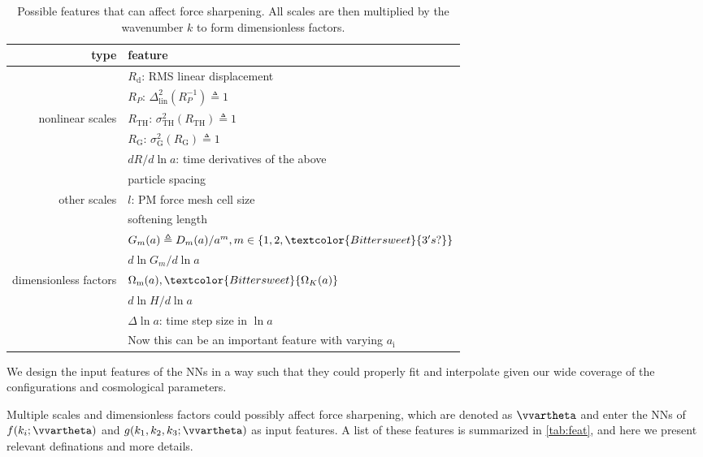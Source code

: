 \documentclass[modern, trackchanges, dvipsnames]{aastex631}
\renewcommand{\d}{d}
\newcommand{\lna}{\ln\!a}
\newcommand{\Omegam}{\Omega_\mathrm{m}}
\newcommand{\OmegaK}{\Omega_K}
\newcommand{\ic}{\mathrm{i}}
\newcommand{\linear}{\mathrm{lin}}
\newcommand{\tophat}{\mathrm{TH}}
\newcommand{\gauss}{\mathrm{G}}
\newcommand{\YL}[1]{\textcolor{Bittersweet}{#1}}
\begin{document}
\begin{table}
  \centering
  \caption{Possible features that can affect force sharpening.
  All scales are then multiplied by the wavenumber $k$ to form dimensionless
  factors.}
  \label{tab:feat}
  \begin{tabular}{rl}
  \toprule
  type & feature \\
  \midrule
  & $R_\mathrm{d}$: RMS linear displacement \\
  \cmidrule(lr){2-2}
  & $R_P$: $\Delta_\linear^2(R_P^{-1}) \triangleq 1$ \\
  \cmidrule(lr){2-2}
  nonlinear scales & $R_\tophat$: $\sigma_\tophat^2(R_\tophat) \triangleq 1$ \\
  \cmidrule(lr){2-2}
  & $R_\gauss$: $\sigma_\gauss^2(R_\gauss) \triangleq 1$ \\
  \cmidrule(lr){2-2}
  & $\d R / \d\lna$: time derivatives of the above \\
  \midrule
  & particle spacing \\
  \cmidrule(lr){2-2}
  other scales & $l$: PM force mesh cell size \\
  \cmidrule(lr){2-2}
  & softening length \\
  \midrule
  & $G_m(a) \triangleq D_m(a) / a^m, m \in \{1, 2, \YL{3's?}\}$ \\
  \cmidrule(lr){2-2}
  & $\d\ln G_m / \d\lna$ \\
  \cmidrule(lr){2-2}
  dimensionless factors & $\Omegam(a), \YL{\OmegaK(a)}$ \\
  \cmidrule(lr){2-2}
  & $\d\ln\!H / \d\lna$ \\
  \cmidrule(lr){2-2}
  & $\Delta\lna$: time step size in $\lna$ \\
  & \YL{Now this can be an important feature with varying $a_\ic$} \\
  \bottomrule
  \end{tabular}
  \end{table}

We design the input features of the NNs in a way such that they could
properly fit and interpolate given our wide coverage of the
configurations and cosmological parameters.

Multiple scales and dimensionless factors could possibly affect force
sharpening, which are denoted as $\vvartheta$ and enter the NNs of $f(k_i;
\vvartheta)$ and $g(k_1, k_2, k_3; \vvartheta)$ as input features.
A list of these features is summarized in \autoref{tab:feat}, and here we
present relevant definations and more details.
\end{document}
